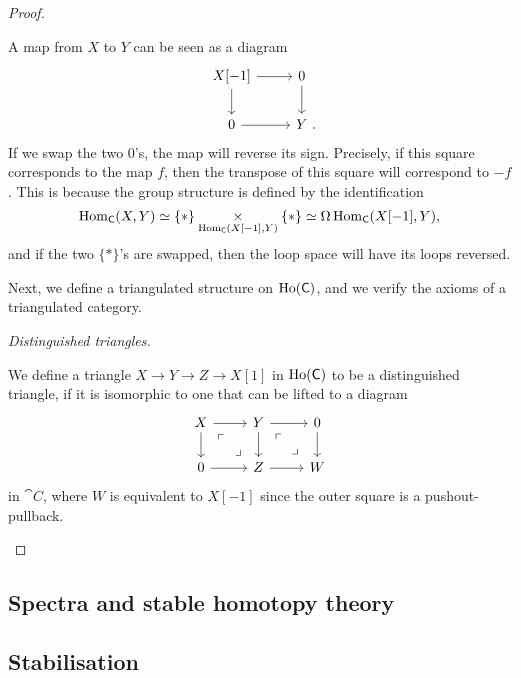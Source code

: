 \begin{proof}
\begin{itms}
        A map from $X$ to $Y$ can be seen as a diagram
        \[\begin{tikzcd}
            X[-1]\ar[r]\ar[d] & 0\ar[d] \\
            0\ar[r] & Y\rlap{\ .}
        \end{tikzcd}\]
        If we swap the two $0$'s, the map will reverse its sign.
        Precisely, if this square corresponds to the map $f$,
        then the transpose of this square will correspond to $-f$.
        This is because the group structure is defined by the identification
        \[\operatorname{Hom}_{\mathsf{C}}(X,Y)\simeq\{*\}\underset{\operatorname{Hom}_{\mathsf{C}}(X[-1],Y)}{\times}\{*\}
        \simeq\Omega\operatorname{Hom}_{\mathsf{C}}(X[-1],Y),\]
        and if the two $\{*\}$'s are swapped,
        then the loop space will have its loops reversed.
    \end{itms}

    Next, we define a triangulated structure on $\operatorname{Ho}(\mathsf{C})$,
    and we verify the axioms of a triangulated category.

    \begin{itms}
        \item \emph{Distinguished triangles.}
        
        We define a triangle $X\to Y\to Z\to X[1]$ in $\operatorname{Ho}(\mathsf{C})$
        to be a distinguished triangle,
        if it is isomorphic to one that can be lifted to a diagram 
        \[\begin{tikzcd}
            X\ar[r]\ar[d]\ar[dr,phantom,"\ulcorner" pos=.25,"\lrcorner" pos=.75] &
            Y\ar[r]\ar[d]\ar[dr,phantom,"\ulcorner" pos=.25,"\lrcorner" pos=.75] & 0\ar[d] \\
            0\ar[r] & Z\ar[r] & W
        \end{tikzcd}\]
        in $\cat{C}$, where $W$ is equivalent to $X[-1]$
        since the outer square is a pushout-pullback.
    \end{itms}

    \tbc
\end{proof}

\subsection{Spectra and stable homotopy theory}

\nyw

\subsection{Stabilisation}

\nyw
